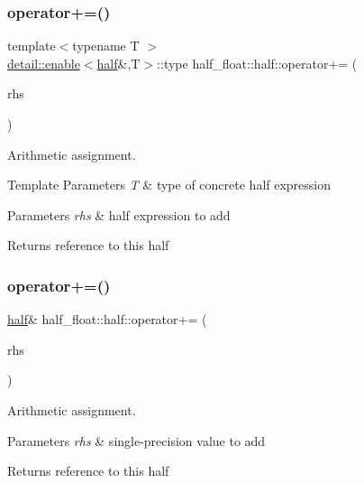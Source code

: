 \subsubsection{\texorpdfstring{operator+=()}{operator+=()}\hspace{0.1cm}{\footnotesize\ttfamily [1/2]}}
{\footnotesize\ttfamily template$<$typename T $>$ \\
\hyperlink{structhalf__float_1_1detail_1_1enable}{detail\+::enable}$<$\hyperlink{classhalf__float_1_1half}{half}\&,T$>$\+::type half\+\_\+float\+::half\+::operator+= (\begin{DoxyParamCaption}\item[{T}]{rhs }\end{DoxyParamCaption})\hspace{0.3cm}{\ttfamily [inline]}}

Arithmetic assignment. 
\begin{DoxyTemplParams}{Template Parameters}
{\em T} & type of concrete half expression \\
\hline
\end{DoxyTemplParams}

\begin{DoxyParams}{Parameters}
{\em rhs} & half expression to add \\
\hline
\end{DoxyParams}
\begin{DoxyReturn}{Returns}
reference to this half 
\end{DoxyReturn}
\mbox{\label{classhalf__float_1_1half_a91d580c2fea1b3a7b285341b79874333}} 
\subsubsection{\texorpdfstring{operator+=()}{operator+=()}\hspace{0.1cm}{\footnotesize\ttfamily [2/2]}}
{\footnotesize\ttfamily \hyperlink{classhalf__float_1_1half}{half}\& half\+\_\+float\+::half\+::operator+= (\begin{DoxyParamCaption}\item[{float}]{rhs }\end{DoxyParamCaption})\hspace{0.3cm}{\ttfamily [inline]}}

Arithmetic assignment. 
\begin{DoxyParams}{Parameters}
{\em rhs} & single-\/precision value to add \\
\hline
\end{DoxyParams}
\begin{DoxyReturn}{Returns}
reference to this half 
\end{DoxyReturn}
\mbox{\label{classhalf__float_1_1half_a3f6f801be0522edc5ae5146012748e5d}} 
